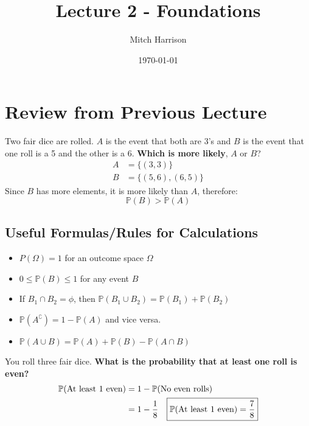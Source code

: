 \documentclass[titlepage, 12pt, leqno]{article}
\title{\Huge{Lecture 2 - Foundations}}
\author{\large{Mitch Harrison}}
\date{\today}
\begin{document}
\setlength{\parskip}{1\baselineskip}
\setlength{\parindent}{15pt}
\maketitle
\tableofcontents
\newpage


\section{Review from Previous Lecture}

\begin{ex}
    Two fair dice are rolled. $A$ is the event that both are 3's and $B$ is the event that one roll is a 5 and the other is a 6. \textbf{Which is more likely}, $A$ or $B$?
   \begin{align*}
       A &= \{(3,3)\} \\
       B &= \{(5,6), (6,5)\}
   \end{align*}
    Since $B$ has more elements, it is more likely than $A$, therefore:
    \[
    \boxed{\mathbb{P}(B) > \mathbb{P}(A)} 
    \]
\end{ex}

\subsection{Useful Formulas/Rules for Calculations}
\begin{itemize}
    \item $P(\Omega) = 1$ for an outcome space $\Omega$ 
    \item $0 \le \mathbb{P}(B) \le 1$ for any event $B$ 
    \item If $B_1 \cap B_2 = \phi $, then $\mathbb{P}(B_1 \cup  B_2) = \mathbb{P}(B_1) + \mathbb{P}(B_2)$ 
    \item $\mathbb{P}(A^\complement) = 1 - \mathbb{P}(A)$ and vice versa.
    \item $\mathbb{P}(A \cup B) = \mathbb{P}(A) + \mathbb{P}(B) - \mathbb{P}(A \cap B)$ 
\end{itemize}

\begin{ex}
    You roll three fair dice. \textbf{What is the probability that at least one roll is even?} 
   \begin{align*}
       \mathbb{P}(\text{At least 1 even}) &= 1 - \mathbb{P}(\text{No even rolls)} \\
        &= 1 - \frac{1}{8} 
        \Aboxed{\mathbb{P}(\text{At least 1 even}) = \frac{7}{8}}
   \end{align*}

\end{ex}
\pagebreak
\end{document}
